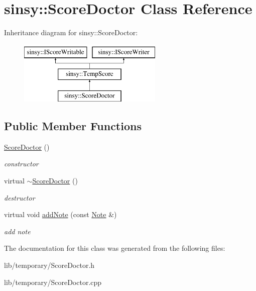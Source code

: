 \hypertarget{classsinsy_1_1ScoreDoctor}{\section{sinsy\-:\-:\-Score\-Doctor \-Class \-Reference}
\label{classsinsy_1_1ScoreDoctor}
}
\-Inheritance diagram for sinsy\-:\-:\-Score\-Doctor\-:\begin{figure}[H]
\begin{center}
\leavevmode
\includegraphics[height=3.000000cm]{classsinsy_1_1ScoreDoctor}
\end{center}
\end{figure}
\subsection*{\-Public \-Member \-Functions}
\begin{DoxyCompactItemize}
\item 
\hypertarget{classsinsy_1_1ScoreDoctor_a030b982f196fb69ee5b03616c12c7935}{\hyperlink{classsinsy_1_1ScoreDoctor_a030b982f196fb69ee5b03616c12c7935}{\-Score\-Doctor} ()}\label{classsinsy_1_1ScoreDoctor_a030b982f196fb69ee5b03616c12c7935}

\begin{DoxyCompactList}\small\item\em constructor \end{DoxyCompactList}\item 
\hypertarget{classsinsy_1_1ScoreDoctor_a2723d156fcf1731e4aeba260a92092e9}{virtual \hyperlink{classsinsy_1_1ScoreDoctor_a2723d156fcf1731e4aeba260a92092e9}{$\sim$\-Score\-Doctor} ()}\label{classsinsy_1_1ScoreDoctor_a2723d156fcf1731e4aeba260a92092e9}

\begin{DoxyCompactList}\small\item\em destructor \end{DoxyCompactList}\item 
\hypertarget{classsinsy_1_1ScoreDoctor_adf4d4ee66366758b84722cfaf11b83b3}{virtual void \hyperlink{classsinsy_1_1ScoreDoctor_adf4d4ee66366758b84722cfaf11b83b3}{add\-Note} (const \hyperlink{classsinsy_1_1Note}{\-Note} \&)}\label{classsinsy_1_1ScoreDoctor_adf4d4ee66366758b84722cfaf11b83b3}

\begin{DoxyCompactList}\small\item\em add note \end{DoxyCompactList}\end{DoxyCompactItemize}


\-The documentation for this class was generated from the following files\-:\begin{DoxyCompactItemize}
\item 
lib/temporary/\-Score\-Doctor.\-h\item 
lib/temporary/\-Score\-Doctor.\-cpp\end{DoxyCompactItemize}
